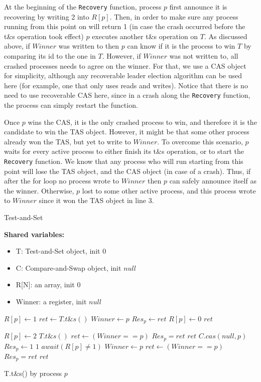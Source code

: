 At the beginning of the \texttt{Recovery} function, process $p$ first announce it is recovering by writing 2 into $R[p]$. Then, in order to make sure any process running from this point on will return 1 (in case the crash occurred before the t\&s operation took effect) $p$ executes another t\&s operation on $T$. As discussed above, if $Winner$ was written to then $p$ can know if it is the process to win $T$ by comparing its id to the one in $T$. However, if $Winner$ was not written to, all crashed processes needs to agree on the winner. For that, we use a CAS object for simplicity, although any recoverable leader election algorithm can be used here (for example, one that only uses reads and writes). Notice that there is no need to use recoverable CAS here, since in a crash along the \texttt{Recovery} function, the process can simply restart the function.

Once $p$ wins the CAS, it is the only crashed process to win, and therefore it is the candidate to win the TAS object. However, it might be that some other process already won the TAS, but yet to write to $Winner$. To overcome this scenario, $p$ waits for every active process to either finish its t\&s operation, or to start the \texttt{Recovery} function. We know that any process who will run starting from this point will lose the TAS object, and the CAS object (in case of a crash). Thus, if after the for loop no process wrote to $Winner$ then $p$ can safely announce itself as the winner. Otherwise, $p$ lost to some other active process, and this process wrote to $Winner$ since it won the TAS object in line 3.


\begin{algorithm}
	\caption{Test-and-Set}\label{recoverable TAS}
	
	\hspace*{\algorithmicindent} \textbf{Shared variables:}
	\begin{itemize}
		\item T: Test-and-Set object, init $0$
		\item C: Compare-and-Swap object, init $null$
		\item R[N]: an array, init $0$
		\item Winner: a register, init $null$
	\end{itemize}
	
	\begin{algorithmic}[1]
		\State $R[p] \gets 1$
		\State $ret \gets T.t\&s()$
			\State $Winner \gets p$
		\EndIf
		\State $Res_p \gets ret$
		\State $R[p] \gets 0$
		\State \Return $ret$
		\EndProcedure
		
		\State $R[p] \gets 2$
		\State $T.t\&s()$
			\State $ret \gets (Winner == p)$
			\State $Res_p = ret$
			\State \Return $ret$
		\EndIf
		\State $C.cas(null,p)$
			\State $Res_p \gets 1$
			\State \Return $1$
		\EndIf
			\State $await(R[p] \neq 1)$
		\EndFor
			\State $Winner \gets p$
		\EndIf
		\State $ret \gets (Winner == p)$
		\State $Res_p = ret$
		\State \Return $ret$
		\EndProcedure
	\end{algorithmic}
	\caption{T.t\&s() by process $p$}
\end{algorithm}